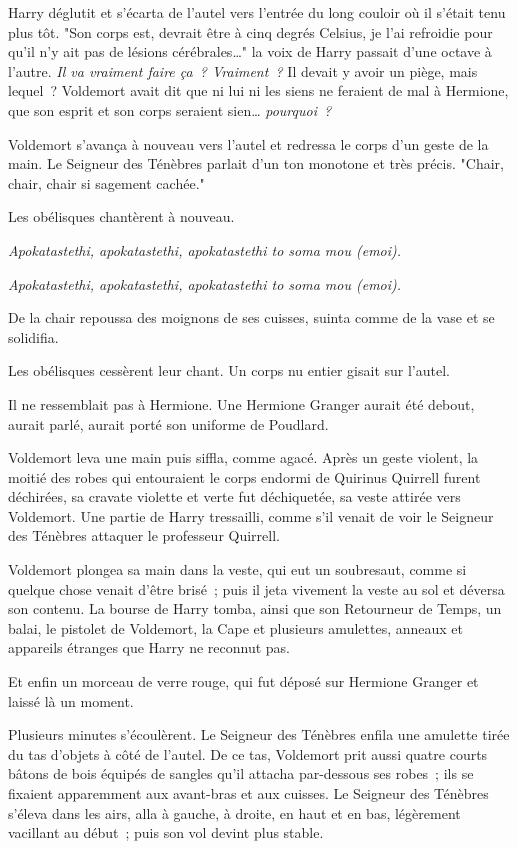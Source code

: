 Harry déglutit et s'écarta de l'autel vers l'entrée du long couloir où il s'était tenu plus tôt. "Son corps est, devrait être à cinq degrés Celsius, je l'ai refroidie pour qu'il n'y ait pas de lésions cérébrales…" la voix de Harry passait d'une octave à l'autre. \emph{Il va vraiment faire ça~? Vraiment~?} Il devait y avoir un piège, mais lequel~? Voldemort avait dit que ni lui ni les siens ne feraient de mal à Hermione, que son esprit et son corps seraient sien… \emph{pourquoi~?}

Voldemort s'avança à nouveau vers l'autel et redressa le corps d'un geste de la main. Le Seigneur des Ténèbres parlait d'un ton monotone et très précis. "Chair, chair, chair si sagement cachée."

Les obélisques chantèrent à nouveau.

\emph{Apokatastethi, apokatastethi, apokatastethi to soma mou (emoi).}

\emph{Apokatastethi, apokatastethi, apokatastethi to soma mou (emoi).}

De la chair repoussa des moignons de ses cuisses, suinta comme de la vase et se solidifia.

Les obélisques cessèrent leur chant. Un corps nu entier gisait sur l'autel.

Il ne ressemblait pas à Hermione. Une Hermione Granger aurait été debout, aurait parlé, aurait porté son uniforme de Poudlard.

Voldemort leva une main puis siffla, comme agacé. Après un geste violent, la moitié des robes qui entouraient le corps endormi de Quirinus Quirrell furent déchirées, sa cravate violette et verte fut déchiquetée, sa veste attirée vers Voldemort. Une partie de Harry tressailli, comme s'il venait de voir le Seigneur des Ténèbres attaquer le professeur Quirrell.

Voldemort plongea sa main dans la veste, qui eut un soubresaut, comme si quelque chose venait d'être brisé~; puis il jeta vivement la veste au sol et déversa son contenu. La bourse de Harry tomba, ainsi que son Retourneur de Temps, un balai, le pistolet de Voldemort, la Cape et plusieurs amulettes, anneaux et appareils étranges que Harry ne reconnut pas.

Et enfin un morceau de verre rouge, qui fut déposé sur Hermione Granger et laissé là un moment.

Plusieurs minutes s'écoulèrent. Le Seigneur des Ténèbres enfila une amulette tirée du tas d'objets à côté de l'autel. De ce tas, Voldemort prit aussi quatre courts bâtons de bois équipés de sangles qu'il attacha par-dessous ses robes~; ils se fixaient apparemment aux avant-bras et aux cuisses. Le Seigneur des Ténèbres s'éleva dans les airs, alla à gauche, à droite, en haut et en bas, légèrement vacillant au début~; puis son vol devint plus stable.

